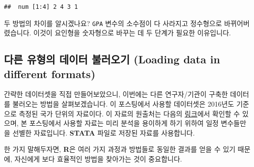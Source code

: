 \documentclass[]{book}
\newenvironment{Shaded}{\begin{snugshade}}{\end{snugshade}}
\newcommand{\CommentTok}[1]{\textcolor[rgb]{0.56,0.35,0.01}{\textit{#1}}}
\newcommand{\KeywordTok}[1]{\textcolor[rgb]{0.13,0.29,0.53}{\textbf{#1}}}
\newcommand{\NormalTok}[1]{#1}
\newcommand{\OperatorTok}[1]{\textcolor[rgb]{0.81,0.36,0.00}{\textbf{#1}}}
\newcommand{\StringTok}[1]{\textcolor[rgb]{0.31,0.60,0.02}{#1}}
\begin{document}
\begin{Shaded}
\end{Shaded}

\begin{verbatim}
##  num [1:4] 2 4 3 1
\end{verbatim}

두 방법의 차이를 알시겠나요? \texttt{GPA} 변수의 소수점이 다 사라지고 정수형으로 바뀌어버렸습니다. 이것이 요인형을 숫자형으로 바꾸는 데 두 단계가 필요한 이유입니다.

\hypertarget{uxb2e4uxb978-uxc720uxd615uxc758-uxb370uxc774uxd130-uxbd88uxb7ecuxc624uxae30-loading-data-in-different-formats}{%
\subsection{다른 유형의 데이터 불러오기 (Loading data in different formats)}\label{uxb2e4uxb978-uxc720uxd615uxc758-uxb370uxc774uxd130-uxbd88uxb7ecuxc624uxae30-loading-data-in-different-formats}}

간략한 데이터셋을 직접 만들어보았으니, 이번에는 다른 연구자/기관이 구축한 데이터를 불러오는 방법을 살펴보겠습니다. 이 포스팅에서 사용할 데이터셋은 2016년도 기준으로 측정된 국가 단위의 자료이다. 이 자료의 원출처는 다음의 \href{https://qog.pol.gu.se/data/datadownloads/data-archive}{링크}에서 확인할 수 있으며, 본 포스팅에서 사용할 자료는 미리 분석을 용이하게 하기 위하여 일정 변수들만을 선별한 자료입니다. \textbf{STATA} 파일로 저장된 자료를 사용합니다.

한 가지 말해두자면, \textbf{R}은 여러 가지 과정과 방법들로 동일한 결과를 얻을 수 있기 때문에, 자신에게 보다 효율적인 방법을 찾아가는 것이 중요합니다.
\end{document}
